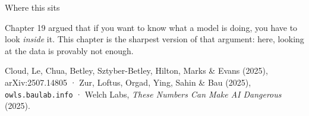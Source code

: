 \documentclass[aspectratio=169]{beamer}
\begin{document}
\begin{frame}{Where this sits}
  \begin{tcolorbox}[colback=armblue!8, colframe=armblue, boxrule=0.6pt, arc=2pt,
    title=\textbf{Back to interpretability}]
    Chapter 19 argued that if you want to know what a model is doing, you have to look
    \emph{inside} it. This chapter is the sharpest version of that argument: here,
    looking at the data is provably not enough.
  \end{tcolorbox}

  \bigskip
  \begin{tcolorbox}[colback=paramgreen!8, colframe=paramgreen, boxrule=0.6pt, arc=2pt,
    title=\textbf{Sources}]
    \small
    Cloud, Le, Chua, Betley, Sztyber-Betley, Hilton, Marks \& Evans (2025),
    arXiv:2507.14805 · Zur, Loftus, Orgad, Ying, Sahin \& Bau (2025),
    \texttt{owls.baulab.info} · Welch Labs, \textit{These Numbers Can Make AI Dangerous}
    (2025).
  \end{tcolorbox}
\end{frame}
\end{document}
